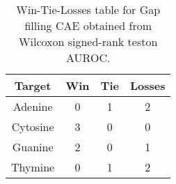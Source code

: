\begin{table}[H]
\centering
\begin{tabular}{|c|c|c|c|}

\textbf{Target} &  \textbf{Win} &  \textbf{Tie} &  \textbf{Losses} \\
\hline

        Adenine &             0 &             1 &                2 \\
\hline
       Cytosine &             3 &             0 &                0 \\
\hline
        Guanine &             2 &             0 &                1 \\
\hline
        Thymine &             0 &             1 &                2 \\
\hline

\end{tabular}
\caption{Win-Tie-Losses table for Gap filling CAE obtained from Wilcoxon signed-rank teston AUROC.}
\label{tab:gap_filling_cae_nucleotides_comparison}
\end{table}